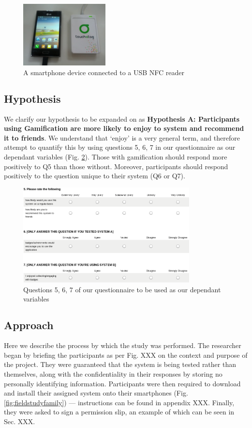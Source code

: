 \begin{figure}[H]
 \centering
  \includegraphics[width=0.4\textwidth]{img/nfcusb.jpg}
     \caption{A smartphone device connected to a USB NFC reader}
     \label{fig:usbnfc}
\end{figure}

\subsection{Hypothesis}
\label{hypothesis}
We clarify our hypothesis to be expanded on as \textbf{Hypothesis A: Participants using Gamification are more likely to enjoy to system and recommend it to friends}. We understand that `enjoy' is a very general term, and therefore attempt to quantify this by using questions 5, 6, 7 in our questionnaire as our dependant variables (Fig. \ref{fig:questionz}). Those with gamification should respond more positively to Q5 than those without. Moreover, participants should respond positively to the question unique to their system (Q6 or Q7).
\begin{figure}[H]
 \centering
  \includegraphics[width=0.81\textwidth]{img/questions.png}
     \caption{Questions 5, 6, 7 of our questionnaire to be used as our dependant variables}
     \label{fig:questionz}
\end{figure}
\subsection{Approach}
Here we describe the process by which the study was performed. The researcher began by briefing the participants as per Fig. XXX on the context and purpose of the project. They were guaranteed that the system is being tested rather than themselves, along with the confidentiality in their responses by storing no personally identifying information. Participants were then required to download and install their assigned system onto their smartphones (Fig. \ref{fig:fieldstudyfamily}) --- instructions can be found in appendix XXX. Finally, they were asked to sign a permission slip, an example of which can be seen in Sec. XXX.

